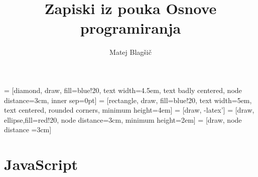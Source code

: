 \documentclass[a4paper, 12pt]{article}
\title{Zapiski iz pouka Osnove programiranja}
\author{Matej Blagšič}
\begin{document}
\lstset{language=html} 

 = [diamond, draw, fill=blue!20, 
text width=4.5em, text badly centered, node distance=3cm, inner sep=0pt]
 = [rectangle, draw, fill=blue!20, 
text width=5em, text centered, rounded corners, minimum height=4em]
 = [draw, -latex']
 = [draw, ellipse,fill=red!20, node distance=3cm,
minimum height=2em]
 = [draw, node distance =3cm]
\maketitle
\thispagestyle{empty}
\pagebreak
\setcounter{page}{1}

\tableofcontents
\pagebreak

\section*{JavaScript}

\end{document}
